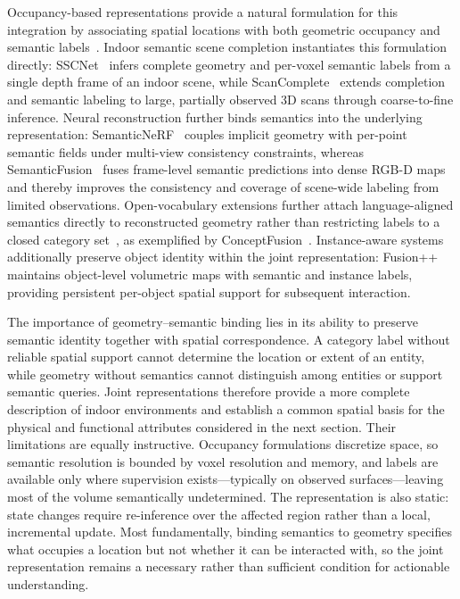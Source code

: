 \documentclass{SCIS2026}
\begin{document}
Occupancy-based representations provide a natural formulation for this integration by associating spatial locations with both geometric occupancy and semantic labels~\cite{cao2022monoscene}. Indoor semantic scene completion instantiates this formulation directly: SSCNet~\cite{song2017sscnet} infers complete geometry and per-voxel semantic labels from a single depth frame of an indoor scene, while ScanComplete~\cite{dai2018scancomplete} extends completion and semantic labeling to large, partially observed 3D scans through coarse-to-fine inference. Neural reconstruction further binds semantics into the underlying representation: SemanticNeRF~\cite{zhi2021semanticnerf} couples implicit geometry with per-point semantic fields under multi-view consistency constraints, whereas SemanticFusion~\cite{mccormac2017semanticfusion} fuses frame-level semantic predictions into dense RGB-D maps and thereby improves the consistency and coverage of scene-wide labeling from limited observations. Open-vocabulary extensions further attach language-aligned semantics directly to reconstructed geometry rather than restricting labels to a closed category set~\cite{takmaz2023openmask3d}, as exemplified by ConceptFusion~\cite{javatavallabhula2023conceptfusion}. Instance-aware systems additionally preserve object identity within the joint representation: Fusion++~\cite{mccormac2018fusionpp} maintains object-level volumetric maps with semantic and instance labels, providing persistent per-object spatial support for subsequent interaction.

The importance of geometry--semantic binding lies in its ability to preserve semantic identity together with spatial correspondence. A category label without reliable spatial support cannot determine the location or extent of an entity, while geometry without semantics cannot distinguish among entities or support semantic queries. Joint representations therefore provide a more complete description of indoor environments and establish a common spatial basis for the physical and functional attributes considered in the next section. Their limitations are equally instructive. Occupancy formulations discretize space, so semantic resolution is bounded by voxel resolution and memory, and labels are available only where supervision exists---typically on observed surfaces---leaving most of the volume semantically undetermined. The representation is also static: state changes require re-inference over the affected region rather than a local, incremental update. Most fundamentally, binding semantics to geometry specifies what occupies a location but not whether it can be interacted with, so the joint representation remains a necessary rather than sufficient condition for actionable understanding.
\end{document}
